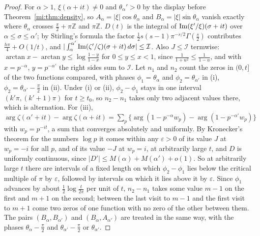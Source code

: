 \begin{proof}
For $\alpha>1$, $\xi(\alpha+it)\ne0$ and $\theta_\alpha'>0$ by the display before Theorem~\ref{mi:thm:density}, so $A_\alpha=|\xi|\cos\theta_\alpha$ and $B_\alpha=|\xi|\sin\theta_\alpha$ vanish exactly where $\theta_\alpha$ crosses $\frac\pi2+\pi\mathbb Z$ and $\pi\mathbb Z$. $D(t)$ is the integral of $\operatorname{Im}(\xi'/\xi)(\sigma+it)$ over $\alpha\le\sigma\le\alpha'$; by Stirling's formula the factor $\frac12s(s-1)\pi^{-s/2}\Gamma(\frac s2)$ contributes $\frac{h\pi}4+O(1/t)$, and $|\int_\alpha^{\alpha'}\operatorname{Im}(\zeta'/\zeta)(\sigma+it)\,d\sigma|\le\mathcal I$. Also $J\le\mathcal I$ termwise: $\arctan x-\arctan y\le\log\frac{1-y}{1-x}$ for $0\le y\le x<1$, since $\frac1{1+u^2}\le\frac1{1-u}$, and with $x=p^{-\alpha}$, $y=p^{-\alpha'}$ the right sides sum to $\mathcal I$. Let $n_1$ and $n_2$ count the zeros in $(0,t]$ of the two functions compared, with phases $\phi_1=\theta_\alpha$ and $\phi_2=\theta_{\alpha'}$ in (i), $\phi_2=\theta_{\alpha'}-\frac\pi2$ in (ii). Under (i) or (ii), $\phi_2-\phi_1$ stays in one interval $(k'\pi,(k'+1)\pi)$ for $t\ge t_0$, so $n_2-n_1$ takes only two adjacent values there, which is alternation. For (iii), $\arg\zeta(\alpha'+it)-\arg\zeta(\alpha+it)=\sum_p\{\arg(1-p^{-\alpha}w_p)-\arg(1-p^{-\alpha'}w_p)\}$ with $w_p=p^{-it}$, a sum that converges absolutely and uniformly. By Kronecker's theorem \cite[Chapter 23]{boHardyWright} for the numbers $\log p$ it comes within any $\varepsilon>0$ of its value $J$ at $w_p=-i$ for all $p$, and of its value $-J$ at $w_p=i$, at arbitrarily large $t$, and $D$ is uniformly continuous, since $|D'|\le M(\alpha)+M(\alpha')+o(1)$. So at arbitrarily large $t$ there are intervals of a fixed length on which $\phi_2-\phi_1$ lies below the critical multiple of $\pi$ by $\varepsilon$, followed by intervals on which it lies above it by $\varepsilon$. Since $\phi_1$ advances by about $\frac12\log\frac t{2\pi}$ per unit of $t$, $n_2-n_1$ takes some value $m-1$ on the first and $m+1$ on the second; between the last visit to $m-1$ and the first visit to $m+1$ come two zeros of one function with no zero of the other between them. The pairs $(B_\alpha,B_{\alpha'})$ and $(B_\alpha,A_{\alpha'})$ are treated in the same way, with the phases $\theta_\alpha-\frac\pi2$ and $\theta_{\alpha'}-\frac\pi2$ or $\theta_{\alpha'}$.
\end{proof}

